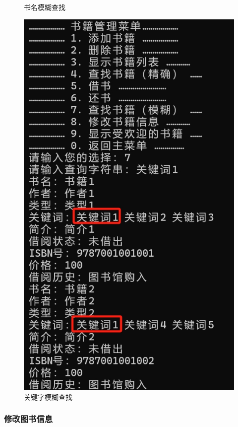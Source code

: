 \documentclass[12pt,twoside]{ctexart}
\begin{document}
\begin{figure}[H]
\begin{minipage}{0.48\textwidth}
        \caption{书名模糊查找}
        \label{fig:Search21}
    \end{minipage}
    \hfill
    \begin{minipage}{0.48\textwidth}
        \centering
        \includegraphics[width=\linewidth]{Book/Search22.png}
        \caption{关键字模糊查找}
        \label{fig:Search22}
    \end{minipage}
\end{figure}


\subsubsection{修改图书信息}
\end{document}
